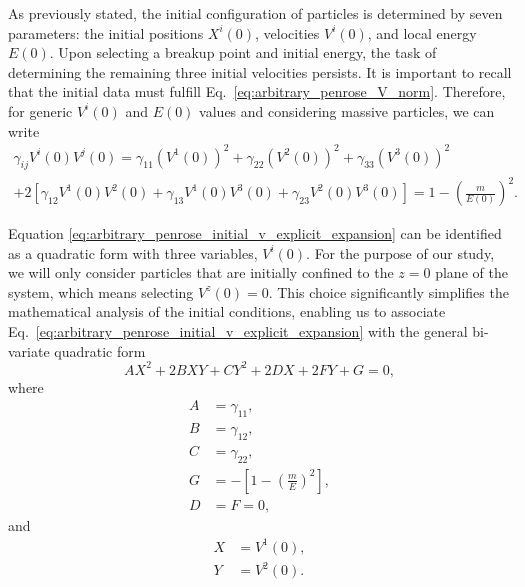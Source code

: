 As previously stated, the initial configuration of particles is determined by seven parameters: the initial positions $X^i(0)$, velocities $V^i(0)$, and local energy $E(0)$. Upon selecting a breakup point and initial energy, the task of determining the remaining three initial velocities persists. It is important to recall that the initial data must fulfill Eq.~\eqref{eq:arbitrary_penrose_V_norm}. Therefore, for generic $V^i(0)$ and $E(0)$ values and considering massive particles, we can write
%
\begin{multline}
  \gamma_{ij} V^{i}(0)V^{j}(0) = \gamma_{11}\left(V^1(0)\right)^2 + \gamma_{22}\left(V^2(0)\right)^2 + \gamma_{33}\left(V^3(0)\right)^2 \\
  + 2\left[ \gamma_{12}V^1(0)V^2(0) + \gamma_{13}V^1(0)V^3(0) + \gamma_{23}V^2(0)V^3(0) \right] = 1-\left(\frac{m}{E(0)}\right)^2.
  \label{eq:arbitrary_penrose_initial_v_explicit_expansion}
\end{multline}

Equation \eqref{eq:arbitrary_penrose_initial_v_explicit_expansion} can be identified as a quadratic form with three variables, $V^i(0)$. For the purpose of our study, we will only consider particles that are initially confined to the $z=0$ plane of the system, which means selecting $V^z(0) = 0$. This choice significantly simplifies the mathematical analysis of the initial conditions, enabling us to associate Eq.~\eqref{eq:arbitrary_penrose_initial_v_explicit_expansion} with the general bi-variate quadratic form
%
\begin{equation}
  A X^2 + 2 B X Y + C Y^2 + 2 D X + 2 F Y + G = 0,
  \label{eq:arbitrary_penrose_general_quadratic_form}
\end{equation}
%
where
%
\begin{align}
  A & = \gamma_{11},                                      \\
  B & = \gamma_{12},                                      \\
  C & = \gamma_{22},                                      \\
  G & = -\left[ 1 - \left( \frac{m}{E} \right)^2 \right], \\
  D & = F = 0,
\end{align}
%
and
%
\begin{align}
  X & = V^1(0),  \\
  Y & = V^2(0).
\end{align}

